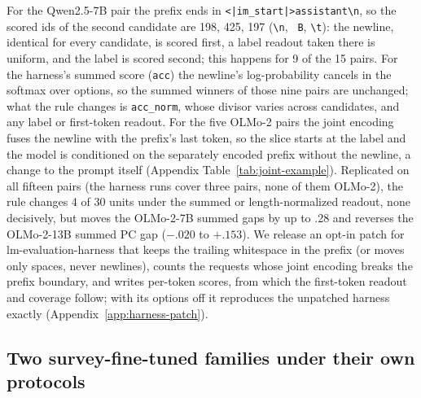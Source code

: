 \documentclass[11pt]{article}
\newcommand{\PC}{\textsc{PC}}
\begin{document}
For the Qwen2.5-7B pair the prefix ends in \texttt{<|im\_start|>assistant\textbackslash n}, so the scored ids of the second candidate are 198, 425, 197 (\texttt{\textbackslash n}, \texttt{ B}, \texttt{\textbackslash t}): the newline, identical for every candidate, is scored first, a label readout taken there is uniform, and the label is scored second; this happens for 9 of the 15 pairs. For the harness's summed score (\texttt{acc}) the newline's log-probability cancels in the softmax over options, so the summed winners of those nine pairs are unchanged; what the rule changes is \texttt{acc\_norm}, whose divisor varies across candidates, and any label or first-token readout. For the five OLMo-2 pairs the joint encoding fuses the newline with the prefix's last token, so the slice starts at the label and the model is conditioned on the separately encoded prefix without the newline, a change to the prompt itself (Appendix Table~\ref{tab:joint-example}). Replicated on all fifteen pairs (the harness runs cover three pairs, none of them OLMo-2), the rule changes 4 of 30 units under the summed or length-normalized readout, none decisively, but moves the OLMo-2-7B summed gaps by up to .28 and reverses the OLMo-2-13B summed \PC{} gap ($-.020$ to $+.153$). We release an opt-in patch for lm-evaluation-harness that keeps the trailing whitespace in the prefix (or moves only spaces, never newlines), counts the requests whose joint encoding breaks the prefix boundary, and writes per-token scores, from which the first-token readout and coverage follow; with its options off it reproduces the unpatched harness exactly (Appendix~\ref{app:harness-patch}).

\subsection{Two survey-fine-tuned families under their own protocols}
\label{sec:socrates}


\end{document}
